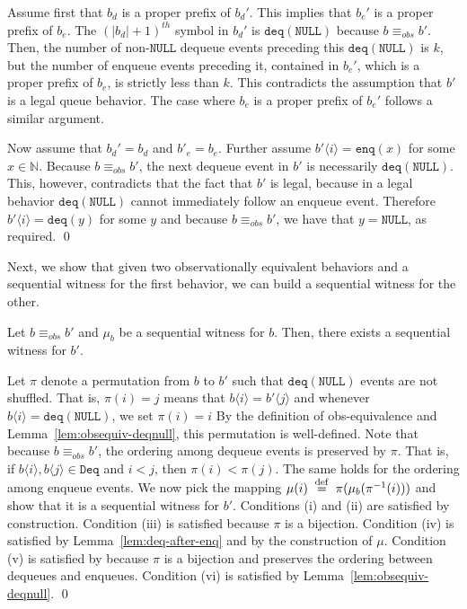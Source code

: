 \documentclass{LMCS}
\newcommand{\defeq}{\;\stackrel{\rm def}{=}\;}
\newcommand{\NULL}{\ensuremath{\mathtt{NULL}}}
\newcommand{\enq}{\ensuremath{\mathtt{enq}}}
\newcommand{\deq}{\ensuremath{\mathtt{deq}}}
\newcommand{\seqx}[2]{\ensuremath{#1\langle #2\rangle}}
\newcommand{\deqset}{\ensuremath{\mathtt{Deq}}}
\newcommand{\obsequiv}{\ensuremath{\equiv_{\mathit{obs}}}}
\newcommand\mylabel[1]{\label{#1}}
\begin{document}
Assume first that $b_d$ is a proper prefix of $b_d'$.
This implies that $b_e'$ is a proper prefix of $b_e$.
The $(|b_d|+1)^{th}$ symbol in $b_d'$ is $\deq(\NULL)$ because $b\obsequiv b'$.
Then, the number of non-{\NULL} dequeue events preceding this $\deq(\NULL)$ is $k$, but the number of enqueue events preceding it, contained in $b_e'$, which is a proper prefix of $b_e$, is strictly less than $k$.
This contradicts the assumption that $b'$ is a legal queue behavior.
The case where $b_e$ is a proper prefix of $b_e'$ follows a similar argument.

Now assume that $b_d'=b_d$ and $b'_e=b_e$.
Further assume $\seqx {b'} i=\enq(x)$ for some $x\in\mathbb{N}$.
Because $b\obsequiv b'$, the next dequeue event in $b'$ is necessarily $\deq(\NULL)$.
This, however, contradicts that the fact that $b'$ is legal, 
because in a legal behavior $\deq(\NULL)$ cannot immediately follow an enqueue event.
Therefore $\seqx {b'} i=\deq(y)$ for some $y$ and because $b\obsequiv b'$, we have that $y=\NULL$, as required.
\qed

Next, we show that given two observationally equivalent behaviors 
and a sequential witness for the first behavior, 
we can build a sequential witness for the other.

\begin{lem}\mylabel{lem:obsequiv-witness}
Let $b\obsequiv b'$ and $\mu_b$ be a sequential witness for $b$.
Then, there exists a sequential witness for $b'$.
\end{lem}
\proof
Let $\pi$ denote a permutation from $b$ to $b'$ such that $\deq(\NULL)$ events are not shuffled.
That is, $\pi(i)=j$ means that $\seqx {b} i=\seqx {b'} j$ and whenever $\seqx b i=\deq(\NULL)$, we set $\pi(i)=i$ By the definition of obs-equivalence and Lemma~\ref{lem:obsequiv-deqnull}, this permutation is well-defined.
Note that because $b \obsequiv b'$, the ordering among dequeue events is preserved by $\pi$.
That is, if $\seqx b i,\seqx b j\in\deqset$ and $i<j$, then $\pi(i)<\pi(j)$.
The same holds for the ordering among enqueue events.
We now pick the mapping $\mu(i) \defeq \pi(\mu_b(\pi^{-1}(i)))$ and show that it is a sequential witness for $b'$.
Conditions (i) and (ii) are satisfied by construction.
Condition (iii) is satisfied because $\pi$ is a bijection.
Condition (iv) is satisfied by Lemma~\ref{lem:deq-after-enq} and by the construction of $\mu$.
Condition (v) is satisfied by because $\pi$ is a bijection and preserves the ordering between dequeues and enqueues.
Condition (vi) is satisfied by Lemma~\ref{lem:obsequiv-deqnull}.
\qed
\end{document}
